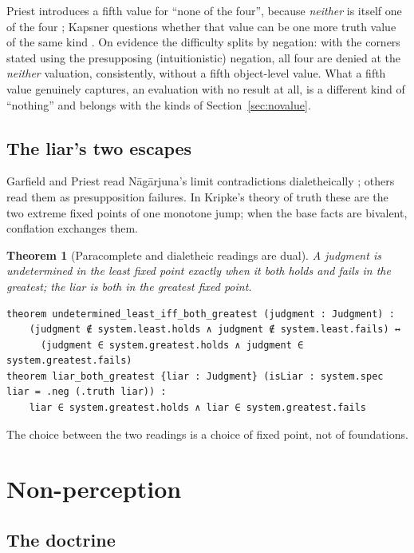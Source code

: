 \documentclass[11pt]{article}
\theoremstyle{plain}
\newtheorem{theorem}{Theorem}[section]
\theoremstyle{definition}
\begin{document}
\noindent Priest introduces a fifth value for ``none of the four'', because \emph{neither}
is itself one of the four \cite{Priest2018}; Kapsner questions whether that value can be one
more truth value of the same kind \cite{Kapsner2020}. On evidence the difficulty splits by negation: with the corners
stated using the presupposing (intuitionistic) negation, all four are denied at the
\emph{neither} valuation, consistently, without a fifth object-level value. What a fifth
value genuinely captures, an evaluation with no result at all, is a different kind of
``nothing'' and belongs with the kinds of Section~\ref{sec:novalue}.

\subsection{The liar's two escapes}

Garfield and Priest read Nāgārjuna's limit contradictions dialetheically
\cite{GarfieldPriest2003}; others read them as presupposition failures. In Kripke's theory of
truth \cite{Kripke1975} these are the two extreme fixed points of one monotone jump; when the
base facts are bivalent, conflation \cite{Fitting1989} exchanges them.

\begin{theorem}[Paracomplete and dialetheic readings are dual]
A judgment is undetermined in the least fixed point exactly when it both holds and fails in
the greatest; the liar is \emph{both} in the greatest fixed point.
\end{theorem}

\begin{lstlisting}
theorem undetermined_least_iff_both_greatest (judgment : Judgment) :
    (judgment ∉ system.least.holds ∧ judgment ∉ system.least.fails) ↔
      (judgment ∈ system.greatest.holds ∧ judgment ∈ system.greatest.fails)
theorem liar_both_greatest {liar : Judgment} (isLiar : system.spec liar = .neg (.truth liar)) :
    liar ∈ system.greatest.holds ∧ liar ∈ system.greatest.fails
\end{lstlisting}

\noindent The choice between the two readings is a choice of fixed point, not of foundations.

\section{Non-perception}
\label{sec:nonperception}

\subsection{The doctrine}
\end{document}
